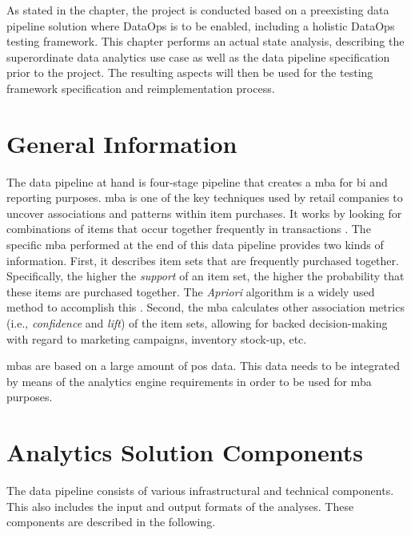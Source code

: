 
As stated in the  chapter, the project is conducted based on a preexisting data pipeline solution where DataOps is to be enabled, including a holistic DataOps testing framework. This chapter performs an actual state analysis, describing the superordinate data analytics use case as well as the data pipeline specification prior to the project. The resulting aspects will then be used for the testing framework specification and reimplementation process.

\section{General Information}
The data pipeline at hand is four-stage pipeline that creates a \acf{mba} for \ac{bi} and reporting purposes. \ac{mba} is one of the key techniques used by retail companies to uncover associations and patterns within item purchases. It works by looking for combinations of items that occur together frequently in transactions \cite[1]{Chen2005}. The specific \ac{mba} performed at the end of this data pipeline provides two kinds of information. First, it describes item sets that are frequently purchased together. Specifically, the higher the \textit{support} of an item set, the higher the probability that these items are purchased together. The \textit{Apriori} algorithm is a widely used method to accomplish this \cite[12\psq]{Wu2008}. Second, the \ac{mba} calculates other association metrics (i.e., \textit{confidence} and \textit{lift}) of the item sets, allowing for backed decision-making with regard to marketing campaigns, inventory stock-up, etc.

\acp{mba} are based on a large amount of \acf{pos} data. This data needs to be integrated by means of the analytics engine requirements in order to be used for \ac{mba} purposes.
\newpage
\section{Analytics Solution Components}
The data pipeline consists of various infrastructural and technical components. This also includes the input and output formats of the analyses. These components are described in the following.

